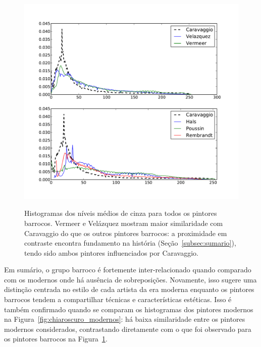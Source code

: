 \begin{figure}[h!]
    
\begin{center}
{    \centering
        \includegraphics[width=\columnwidth]{figs/chiaroscuro}}
      \caption{Histogramas dos níveis médios de cinza para todos os
        pintores barrocos. Vermeer e Velázquez mostram maior
        similaridade com Caravaggio do que os outros pintores
        barrocos: a proximidade em contraste encontra fundamento na
        história (Seção~\ref{subsec:sumario}), tendo sido ambos
        pintores influenciados por Caravaggio.}
        \label{fig:chiaroscuro}
  \end{center}
\end{figure}

Em sumário, o grupo barroco é fortemente inter-relacionado quando comparado com
os modernos onde há ausência de sobreposições. Novamente, isso sugere uma
distinção centrada no estilo de cada artista da era moderna enquanto os pintores
barrocos tendem a compartilhar técnicas e características estéticas. Isso é
também confirmado quando se comparam os histogramas dos pintores modernos na
Figura~\ref{fig:chiaroscuro_modernos}: há baixa similaridade entre os pintores
modernos considerados, contrastando diretamente com o que foi observado para os
pintores barrocos na Figura~\ref{fig:chiaroscuro}.

